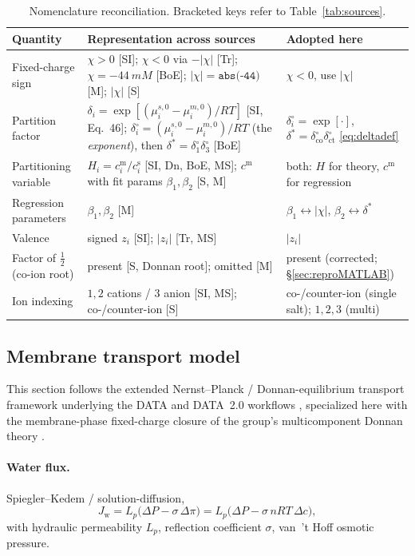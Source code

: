 \documentclass[11pt]{article}
\newcommand{\cm}[1]{{c^{\mathrm{m}}_{#1}}}
\newcommand{\cs}[1]{{c^{\mathrm{s}}_{#1}}}
\newcommand{\co}{\mathrm{co}}
\newcommand{\ct}{\mathrm{ct}}
\newcommand{\Jw}{J_{\mathrm{w}}}
\newcommand{\dstar}{\delta^{*}}
\begin{document}
\begin{table}[H]
\centering\footnotesize
\begin{tabular}{p{2.5cm} p{8.3cm} p{3.4cm}}
\toprule
Quantity & Representation across sources & Adopted here \\
\midrule
Fixed-charge sign &
  $\chi>0$ [SI]; $\chi<0$ via $-|\chi|$ [Tr]; $\chi=\SI{-44}{mM}$ [BoE]; $|\chi|=\texttt{abs(-44)}$ [M]; $|\chi|$ [S] &
  $\chi<0$, use $|\chi|$ \\
Partition factor &
  $\delta_i=\exp[(\mu^{s,0}_i-\mu^{m,0}_i)/RT]$ [SI, Eq.~46]; $\delta^{\circ}_i=(\mu^{s,0}_i-\mu^{m,0}_i)/RT$ (the \emph{exponent}), then $\dstar=\delta^{\circ}_1\delta^{\circ}_3$ [BoE] &
  $\delta^{\circ}_i=\exp[\cdot]$, $\dstar=\delta^{\circ}_{\co}\delta^{\circ}_{\ct}$ \eqref{eq:deltadef} \\
Partitioning variable &
  $H_i=\cm{i}/\cs{i}$ [SI, Dn, BoE, MS]; $\cm{}$ with fit params $\beta_1,\beta_2$ [S, M] &
  both: $H$ for theory, $\cm{}$ for regression \\
Regression parameters &
  $\beta_1,\beta_2$ [M] &
  $\beta_1\!\leftrightarrow\!|\chi|$, $\beta_2\!\leftrightarrow\!\dstar$ \\
Valence &
  signed $z_i$ [SI]; $|z_i|$ [Tr, MS] &
  $|z_i|$ \\
Factor of $\tfrac12$ (co-ion root) &
  present [S, Donnan root]; omitted [M] &
  present (corrected; \S\ref{sec:reproMATLAB}) \\
Ion indexing &
  $1,2$ cations / $3$ anion [SI, MS]; co-/counter-ion [S] &
  co-/counter-ion (single salt); $1,2,3$ (multi) \\
\bottomrule
\end{tabular}
\caption{Nomenclature reconciliation. Bracketed keys refer to
Table~\ref{tab:sources}.}
\label{tab:nomen}
\end{table}

\subsection{Membrane transport model}\label{sec:transport}
This section follows the extended Nernst--Planck / Donnan-equilibrium transport
framework underlying the DATA and DATA~2.0 workflows
\cite{ouimet2022data1,liu2025data2}, specialized here with the membrane-phase
fixed-charge closure of the group's multicomponent Donnan theory
\cite{multicompDonnanTheory}.

\paragraph{Water flux.} Spiegler--Kedem / solution-diffusion,
\begin{equation}
  \Jw = L_p\big(\Delta P - \sigma\,\Delta\pi\big)
      = L_p\big(\Delta P - \sigma\, n R T\,\Delta c\big),
  \label{eq:Jw}
\end{equation}
with hydraulic permeability $L_p$, reflection coefficient $\sigma$, van~'t Hoff
osmotic pressure.
\end{document}
